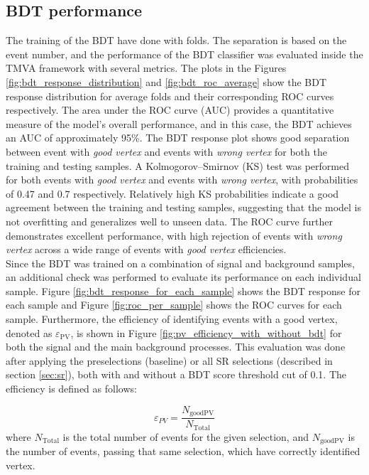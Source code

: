 \subsection{BDT performance}
The training of the BDT have done with folds. The separation is based on the event number, and the performance of the BDT classifier was evaluated inside the TMVA framework with several metrics. The plots in the Figures \ref{fig:bdt_response_distribution} and \ref{fig:bdt_roc_average} show the BDT response distribution for average folds and their corresponding ROC curves respectively.
The area under the ROC curve (AUC) provides a quantitative measure of the model’s overall performance, and in this case, the BDT achieves an AUC of approximately 95\%.
The BDT response plot shows good separation between event with \textit{good vertex} and events with \textit{wrong vertex} for both the training and testing samples. A Kolmogorov–Smirnov (KS) test was performed for both events with \textit{good vertex} and events with \textit{wrong vertex}, with probabilities of 0.47 and 0.7 respectively. Relatively high KS probabilities indicate a good agreement between the training and testing samples, suggesting that the model is not overfitting and generalizes well to unseen data.
The ROC curve further demonstrates excellent performance, with high rejection of events with \textit{wrong vertex} across a wide range of events with \textit{good vertex} efficiencies.\\
Since the BDT was trained on a combination of signal and background samples, an additional check was performed to evaluate its performance on each individual sample. Figure \ref{fig:bdt_response_for_each_sample} shows the BDT response for each sample and Figure \ref{fig:roc_per_sample} shows the ROC curves for each sample. Furthermore, the efficiency of identifying events with a good vertex, denoted as $\varepsilon_{\mathrm{PV}}$, is shown in Figure \ref{fig:pv_efficiency_with_without_bdt} for both the signal and the main background processes.
This evaluation was done after applying the preselections (baseline) or all SR selections (described in section \ref{sec:sr}), both with and without a BDT score threshold cut of 0.1. The efficiency is defined as follows:

\[
\varepsilon_{PV} = \frac{N_{\text{goodPV}}}{N_{\text{Total}}}
\]
where $N_{\text{Total}}$ is the total number of events for the given selection, and $N_{\text{goodPV}}$ is the number of events, passing that same selection, which have correctly identified vertex. 

